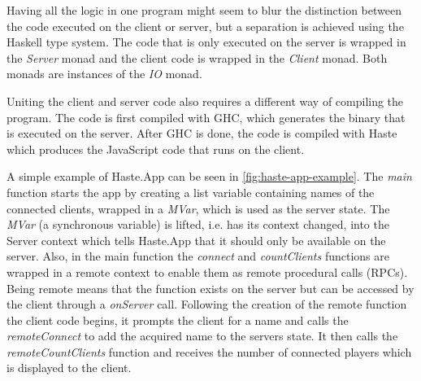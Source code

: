 \documentclass[a4paper]{article}
\begin{document}
Having all the logic in one program might seem to blur the distinction between the code executed on the client or server, but a separation is achieved using the Haskell type system. The code that is only executed on the server is wrapped in the \textit{Server} monad and the client code is wrapped in the \textit{Client} monad. Both monads are instances of the \textit{IO} monad. 

Uniting the client and server code also requires a different way of compiling the program. The code is first compiled with GHC, which generates the binary that is executed on the server. After GHC is done, the code is compiled with Haste which produces the JavaScript code that runs on the client. 

A simple example of Haste.App can be seen in \cref{fig:haste-app-example}. The \textit{main} function starts the app by creating a list variable containing names of the connected clients, wrapped in a \textit{MVar}, which is used as the server state. The \textit{MVar} (a synchronous variable) is lifted, i.e. has its context changed, into the Server context which tells Haste.App that it should only be available on the server. Also, in the main function the \textit{connect} and \textit{countClients} functions are wrapped in a remote context to enable them as remote procedural calls (RPCs). Being remote means that the function exists on the server but can be accessed by the client through a \textit{onServer} call. Following the creation of the remote function the client code begins, it prompts the client for a name and calls the \textit{remoteConnect} to add the acquired name to the servers state. It then calls the \textit{remoteCountClients} function and receives the number of connected players which is displayed to the client. 
\end{document}
